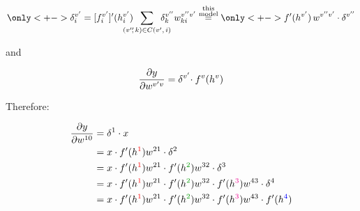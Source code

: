 \begin{frame}\frametitle{\subsecname}
	    \begin{equation}
            \only<+->{
        {\delta_i^{v'}}
        =
        [f_i^{v'}]'({h_i^{v'}}) 
        \kern-3ex\sum_{(v''\hspace{-1mm},\,k) \in C(v',\,i)}\kern-3ex
        {\delta_k^{v''}} 
        {w}_{ki}^{v'' v'}
        }
            \stackrel{{
    \substack{\text{this}\\ \text{model}}}
    }{=} 
            \only<+->{
            f'({h^{v'}}) \,
        {w}^{v'' v'} \cdot
    {\delta^{v''}} 
            }
    \end{equation}
    
    and 
    \slidesonly{
	\vspace{-5mm}
	}
    
    \begin{equation}
     \frac{\partial y}{\partial w^{v'v}} = 
				{ \delta^{v'}} \kern-.5ex\cdot
			   			f^v( {h^v} )
    \end{equation}
    
    Therefore:
    \slidesonly{
	\vspace{-8mm}
	}
    
    \begin{align}
     \frac{\partial y}{\partial w^{10}} 
     &= \delta^{1} \cdot x \\
	 &= x \cdot f'(h^{\color{red}1}) w^{21} \cdot \delta^2\\
	 &= x \cdot f'(h^{\color{red}1}) w^{21} \cdot f'(h^{\color{darkgreen}2}) w^{32} \cdot \delta^3\\
	 &= x \cdot f'(h^{\color{red}1}) w^{21} \cdot f'(h^{\color{darkgreen}2}) w^{32} \cdot f'(h^{\color{magenta}3}) w^{43} \cdot \delta^4\\
	 &= x \cdot f'(h^{\color{red}1}) w^{21} \cdot f'(h^{\color{darkgreen}2}) w^{32} \cdot f'(h^{\color{magenta}3}) w^{43} \cdot f'(h^{\color{blue}4})
    \end{align}
\end{frame}
